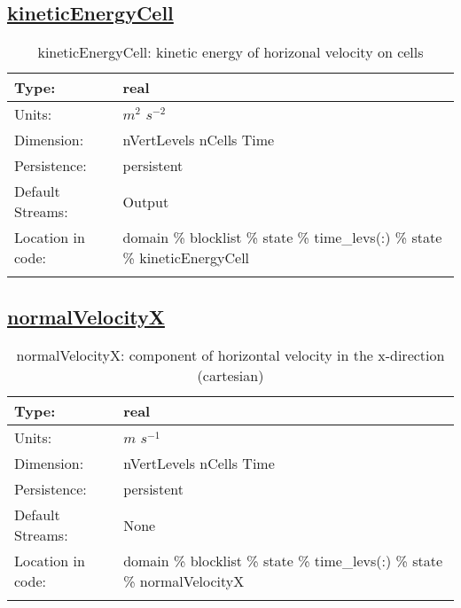 \subsection[kineticEnergyCell]{\hyperref[sec:var_tab_state]{kineticEnergyCell}}
\label{subsec:var_sec_state_kineticEnergyCell}
\begin{center}
\begin{longtable}{| p{2.0in} | p{4.0in} |}
        \hline 
        Type: & real \\
        \hline 
        Units: & $m^2$ $s^{-2}$ \\
        \hline 
        Dimension: & nVertLevels nCells Time \\
        \hline 
        Persistence: & persistent \\
        \hline 
		 Default Streams: & Output  \\
        \hline 
		 Location in code: & domain \% blocklist \% state \% time\_levs(:) \% state \% kineticEnergyCell \\
		 \hline 
    \caption{kineticEnergyCell: kinetic energy of horizonal velocity on cells}
\end{longtable}
\end{center}
\subsection[normalVelocityX]{\hyperref[sec:var_tab_state]{normalVelocityX}}
\label{subsec:var_sec_state_normalVelocityX}
\begin{center}
\begin{longtable}{| p{2.0in} | p{4.0in} |}
        \hline 
        Type: & real \\
        \hline 
        Units: & $m$ $s^{-1}$ \\
        \hline 
        Dimension: & nVertLevels nCells Time \\
        \hline 
        Persistence: & persistent \\
        \hline 
		 Default Streams: & None \\
        \hline 
		 Location in code: & domain \% blocklist \% state \% time\_levs(:) \% state \% normalVelocityX \\
		 \hline 
    \caption{normalVelocityX: component of horizontal velocity in the x-direction (cartesian)}
\end{longtable}
\end{center}
